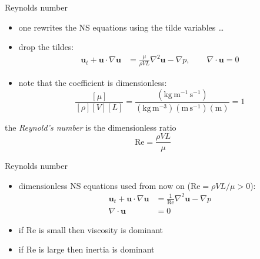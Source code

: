 \documentclass[10pt,hyperref,colorlinks]{beamer}
\newcommand{\bu}{\mathbf{u}}
\newcommand{\grad}{\nabla}
\newcommand{\Div}{\nabla\cdot}
\renewcommand{\Re}{\text{Re}}
\begin{document}
\begin{frame}{Reynolds number}

\begin{itemize}
\item one rewrites the NS equations using the tilde variables \dots
\item drop the tildes:
\begin{align*}
\bu_t + \bu \cdot \grad \bu &= \frac{\mu}{\rho V L} \grad^2 \bu - \grad p, \qquad 
\Div \bu = 0
\end{align*}
\item note that the coefficient is dimensionless:
	$$\frac{[\mu]}{[\rho] [V] [L]} = \frac{(\text{kg}\,\text{m}^{-1}\,\text{s}^{-1})}{(\text{kg}\,\text{m}^{-3}) (\text{m}\,\text{s}^{-1}) (\text{m})} = 1$$
\end{itemize}
\begin{definition} the \emph{Reynold's number} is the dimensionless ratio
	$$\Re = \frac{\rho V L}{\mu}$$
\end{definition}
\end{frame}


\begin{frame}{Reynolds number}

\begin{itemize}
\item dimensionless NS equations used from now on ($\Re = \rho V L/\mu > 0$):
\begin{align*}
\bu_t + \bu \cdot \grad \bu &= \frac{1}{\Re} \grad^2 \bu - \grad p \\
\Div \bu &= 0
\end{align*}
\item if $\Re$ is small then viscosity is dominant
\item if $\Re$ is large then inertia is dominant
\end{itemize}
\end{frame}
\end{document}
